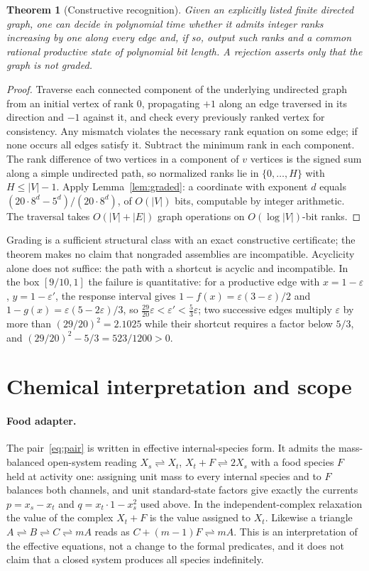 \documentclass[11pt,a4paper]{article}
\theoremstyle{plain}
\newtheorem{theorem}{Theorem}[section]
\theoremstyle{definition}
\theoremstyle{remark}
\newcommand{\rev}{\rightleftharpoons}
\begin{document}
\begin{theorem}[Constructive recognition]\label{thm:recognition}
Given an explicitly listed finite directed graph, one can decide in polynomial time whether it admits integer ranks increasing by one along every edge and, if so, output such ranks and a common rational productive state of polynomial bit length. A rejection asserts only that the graph is not graded.
\end{theorem}
\begin{proof}
Traverse each connected component of the underlying undirected graph from an initial vertex of rank $0$, propagating $+1$ along an edge traversed in its direction and $-1$ against it, and check every previously ranked vertex for consistency. Any mismatch violates the necessary rank equation on some edge; if none occurs all edges satisfy it. Subtract the minimum rank in each component. The rank difference of two vertices in a component of $v$ vertices is the signed sum along a simple undirected path, so normalized ranks lie in $\{0,\dots,H\}$ with $H\le|V|-1$. Apply Lemma~\ref{lem:graded}: a coordinate with exponent $d$ equals $(20\cdot8^d-5^d)/(20\cdot8^d)$, of $O(|V|)$ bits, computable by integer arithmetic. The traversal takes $O(|V|+|E|)$ graph operations on $O(\log|V|)$-bit ranks.
\end{proof}

Grading is a sufficient structural class with an exact constructive certificate; the theorem makes no claim that nongraded assemblies are incompatible. Acyclicity alone does not suffice: the path with a shortcut is acyclic and incompatible. In the box $[9/10,1]$ the failure is quantitative: for a productive edge with $x=1-\varepsilon$, $y=1-\varepsilon'$, the response interval gives $1-f(x)=\varepsilon(3-\varepsilon)/2$ and $1-g(x)=\varepsilon(5-2\varepsilon)/3$, so $\frac{29}{20}\varepsilon<\varepsilon'<\frac53\varepsilon$; two successive edges multiply $\varepsilon$ by more than $(29/20)^2=2.1025$ while their shortcut requires a factor below $5/3$, and $(29/20)^2-5/3=523/1200>0$.

\section{Chemical interpretation and scope}\label{sec:chemistry}

\paragraph{Food adapter.} The pair~\eqref{eq:pair} is written in effective internal-species form. It admits the mass-balanced open-system reading $X_s\rev X_t$, $X_t+F\rev 2X_s$ with a food species $F$ held at activity one: assigning unit mass to every internal species and to $F$ balances both channels, and unit standard-state factors give exactly the currents $p=x_s-x_t$ and $q=x_t\cdot1-x_s^2$ used above. In the independent-complex relaxation the value of the complex $X_t+F$ is the value assigned to $X_t$. Likewise a triangle $A\rev B\rev C\rev mA$ reads as $C+(m-1)F\rev mA$. This is an interpretation of the effective equations, not a change to the formal predicates, and it does not claim that a closed system produces all species indefinitely.
\end{document}
